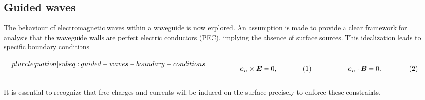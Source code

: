 \documentclass[11pt,a4paper,twoside,openany]{report}
\begin{document}
\subsection{Guided waves}
The behaviour of electromagnetic waves within a waveguide is now explored. An assumption is made to provide a clear framework for analysis that the waveguide walls are perfect electric conductors (PEC), implying the absence of surface sources. This idealization leads to specific boundary conditions\\
\begin{subequations}
    \label[pluralequation]{subeq:guided-waves-boundary-conditions}
    \noindent\centering
    \begin{minipage}{0.45\textwidth}
        \begin{align}
            \label{eq:guided-waves-boundary-condition-e}
            \vec e_n \times \vec E &= 0,
        \end{align}
    \end{minipage}
    \hfill
    \begin{minipage}{0.45\textwidth}
        \begin{align}
            \label{eq:guided-waves-boundary-condition-b}
            \vec e_n \cdot \vec B &= 0.
        \end{align}
    \end{minipage}\bigskip
\end{subequations}\\
It is essential to recognize that free charges and currents will be induced on the surface precisely to enforce these constraints.
\end{document}
